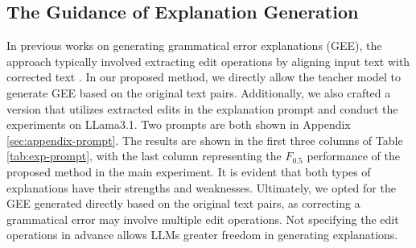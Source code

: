 \subsection{The Guidance of Explanation Generation}
\label{sec:exp_prompt_influence}



In previous works on generating grammatical error explanations (GEE), the approach typically involved extracting edit operations by aligning input text with corrected text \cite{kaneko-okazaki-2024-controlled, song-etal-2024-gee}. In our proposed method, we directly allow the teacher model to generate GEE based on the original text pairs. Additionally, we also crafted a version that utilizes extracted edits in the explanation prompt and conduct the experiments on LLama3.1. Two prompts are both shown in Appendix \ref{sec:appendix-prompt}. The results are shown in the first three columns of Table \ref{tab:exp-prompt}, with the last column representing the $F_{0.5}$ performance of the proposed method in the main experiment. It is evident that both types of explanations have their strengths and weaknesses. Ultimately, we opted for the GEE generated directly based on the original text pairs, as correcting a grammatical error may involve multiple edit operations. Not specifying the edit operations in advance allows LLMs greater freedom in generating explanations.

